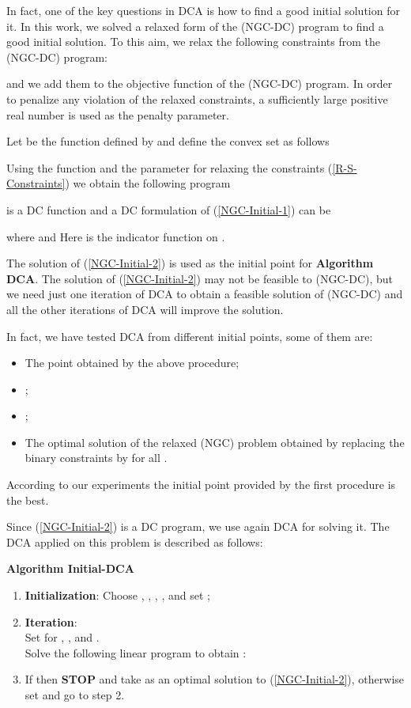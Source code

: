 \documentclass{iesmart}
\begin{document}

In fact, one of the key questions in DCA is how to find a good
initial solution for it. In this work, we solved a relaxed form of
the (NGC-DC) program to find a good initial solution. To this aim,
we relax the following constraints from the (NGC-DC) program:

 and we add them to the objective function of the (NGC-DC) program. In order to penalize any
 violation of the relaxed constraints, a sufficiently large positive real number  is used as the penalty
 parameter.

 Let  be the function defined by
and define the convex set  as follows


Using the function  and the parameter  for relaxing
the constraints (\ref{R-S-Constraints}) we obtain the following
program

 is a DC function and a DC formulation of
(\ref{NGC-Initial-1}) can be


 where
 and
 Here  is the indicator function on .

The solution of (\ref{NGC-Initial-2}) is used as the initial point
for \textbf{Algorithm DCA}. The solution of (\ref{NGC-Initial-2})
may not be feasible to (NGC-DC), but we need just one iteration of
DCA to obtain a feasible solution of (NGC-DC) and all the other
iterations of DCA will improve the solution.

In fact, we have tested DCA from different initial points, some of
them are:
\begin{itemize}
\item The point obtained by the above procedure;\item ;\item ;\item The optimal solution of the relaxed (NGC) problem obtained
by replacing the binary constraints  by  for all .
\end{itemize}
According to our experiments the initial point provided by the
first procedure is the best.

Since (\ref{NGC-Initial-2}) is a DC program, we use again DCA for
solving it. The DCA applied on this problem is described as
follows:

\noindent \textbf{Algorithm Initial-DCA}
\begin{enumerate}
    \item \textbf{Initialization}: Choose , , , , and set ;
    \item \textbf{Iteration}:\\
    Set
    for , , and .\\
    Solve the following linear program to obtain :
    
    \item If  then \textbf{STOP} and take  as an optimal
    solution to (\ref{NGC-Initial-2}), otherwise set
     and go to step 2.
\end{enumerate}
\end{document}
